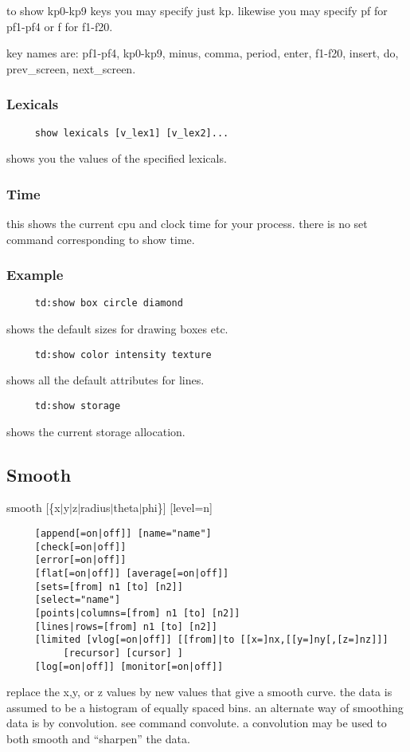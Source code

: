 to show kp0-kp9 keys you may specify just kp.  likewise you may specify
pf for pf1-pf4 or f for f1-f20.  

key names are:  
pf1-pf4,  kp0-kp9,  minus,  comma,  period,  enter, f1-f20, insert, do,
prev\_screen, next\_screen.  
\subsubsection{Lexicals}
\begin{verbatim}
     show lexicals [v_lex1] [v_lex2]...  
\end{verbatim}
shows you the values of the specified lexicals.  
\subsubsection{Time}
this  shows  the current cpu and clock time for your process.  there is
no set command corresponding to show time.  
\subsubsection{Example}
\begin{verbatim}
     td:show box circle diamond 
\end{verbatim}
shows the default sizes for drawing boxes etc.  

\begin{verbatim}
     td:show color intensity texture 
\end{verbatim}
shows all the default attributes for lines.  

\begin{verbatim}
     td:show storage 
\end{verbatim}
shows the current storage allocation.  
\subsection{Smooth}
smooth [\{x$|$y$|$z$|$radius$|$theta$|$phi\}] [level=n] 
\begin{verbatim}
     [append[=on|off]] [name="name"] 
     [check[=on|off]] 
     [error[=on|off]] 
     [flat[=on|off]] [average[=on|off]] 
     [sets=[from] n1 [to] [n2]] 
     [select="name"] 
     [points|columns=[from] n1 [to] [n2]] 
     [lines|rows=[from] n1 [to] [n2]] 
     [limited [vlog[=on|off]] [[from]|to [[x=]nx,[[y=]ny[,[z=]nz]]]
          [recursor] [cursor] ] 
     [log[=on|off]] [monitor[=on|off]] 
\end{verbatim}

replace the x,y, or z values by new values that give a smooth curve.  the
data is assumed to be a histogram of equally spaced bins.   an  alternate
way  of  smoothing  data  is  by  convolution.  see command convolute.  a
convolution may be used to both smooth and ``sharpen'' the data.  
